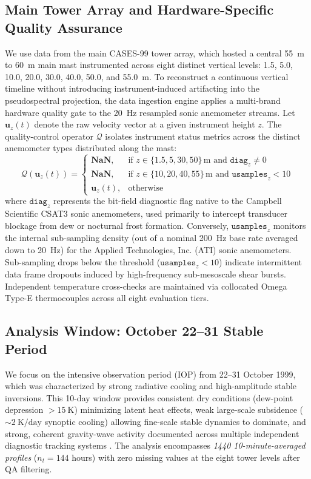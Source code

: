\documentclass[11pt,a4paper]{article}
\begin{document}
\subsection{Main Tower Array and Hardware-Specific Quality Assurance}
We use data from the main CASES-99 tower array, which hosted a central \SI{55}{\meter} to \SI{60}{\meter} main mast instrumented across eight distinct vertical levels: 1.5, 5.0, 10.0, 20.0, 30.0, 40.0, 50.0, and \SI{55.0}{\meter}. To reconstruct a continuous vertical timeline without introducing instrument-induced artifacting into the pseudospectral projection, the data ingestion engine applies a multi-brand hardware quality gate to the 20~Hz resampled sonic anemometer streams. Let $\mathbf{u}_z(t)$ denote the raw velocity vector at a given instrument height $z$. The quality-control operator $\mathcal{Q}$ isolates instrument status metrics across the distinct anemometer types distributed along the mast:
\begin{equation}
\mathcal{Q}\left(\mathbf{u}_z(t)\right) =
\begin{cases}
\mathbf{NaN}, & \text{if } z \in \{1.5, 5, 30, 50\}\,\text{m and } \mathtt{diag}_z \neq 0 \\
\mathbf{NaN}, & \text{if } z \in \{10, 20, 40, 55\}\,\text{m and } \mathtt{usamples}_z < 10 \\
\mathbf{u}_z(t), & \text{otherwise}
\end{cases}
\end{equation}
where $\mathtt{diag}_z$ represents the bit-field diagnostic flag native to the Campbell Scientific CSAT3 sonic anemometers, used primarily to intercept transducer blockage from dew or nocturnal frost formation. Conversely, $\mathtt{usamples}_z$ monitors the internal sub-sampling density (out of a nominal 200~Hz base rate averaged down to 20~Hz) for the Applied Technologies, Inc. (ATI) sonic anemometers. Sub-sampling drops below the threshold ($\mathtt{usamples}_z < 10$) indicate intermittent data frame dropouts induced by high-frequency sub-mesoscale shear bursts. Independent temperature cross-checks are maintained via collocated Omega Type-E thermocouples across all eight evaluation tiers.

\subsection{Analysis Window: October 22--31 Stable Period}

We focus on the intensive observation period (IOP) from 22--31 October 1999, which was characterized by strong radiative cooling and high-amplitude stable inversions. This 10-day window provides consistent dry conditions (dew-point depression $> \SI{15}{\kelvin}$) minimizing latent heat effects, weak large-scale subsidence ($\sim \SI{2}{\kelvin\per\text{day}}$ synoptic cooling) allowing fine-scale stable dynamics to dominate, and strong, coherent gravity-wave activity documented across multiple independent diagnostic tracking systems \citep{Poulos2002}. The analysis encompasses \emph{1440 10-minute-averaged profiles} ($n_t = 144$ hours) with zero missing values at the eight tower levels after QA filtering.
\end{document}
